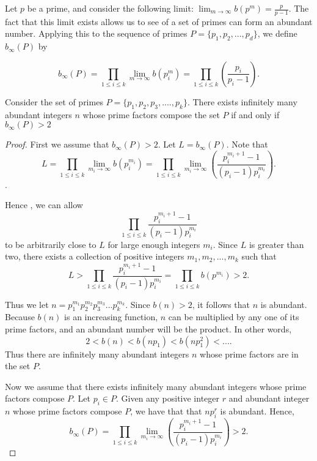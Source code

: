 \documentclass[../paper.tex]{article}
\begin{document}
Let $p$ be a prime, and consider the following limit: 
$\lim_{m \rightarrow \infty}b(p^m) = \frac{p}{p-1}$.
The fact that this limit exists allows us to see of a set
of primes can form an abundant number.
Applying this to the sequence of primes $P = \{p_1, p_2, ..., p_d\}$,
we define $b_{\infty}(P)$ by

\begin{equation}\label{b_inf_def}
  b_{\infty}(P) 
  = \prod_{1 \leq i \leq k} \lim_{m \rightarrow \infty}b(p_i^m)
                = \prod_{1 \leq i \leq k}(\frac{p_i}{p_i - 1}) .
\end{equation}

\begin{theorem}\label{b_inf_1}
Consider the set of primes 
%
$P = \{p_{1}, p_{2}, p_{3}, .... , p_{k}\}$.
%
There exists infinitely many abundant integers $n$ whose prime 
factors compose the set $P$  if and only if $b_{\infty}(P) > 2$

\end{theorem}

\begin{proof}

First we assume that $b_{\infty}(P) > 2$. Let $L = b_\infty(P)$. 
Note that
%  
$$L 
%
= \prod_{1 \leq i \leq k} \lim_{m_i \rightarrow \infty}b(p_i^{m_i}) 
%
= \prod_{1 \leq i \leq k} \lim_{m_i \rightarrow \infty} 
%
( \frac{p_i^{m_{i} + 1} -1}{(p_i -1)p_{i}^{m_{i}}}) .$$.

Hence , we can allow
$$\prod_{1 \leq i \leq k} \frac{p_i^{m_{i} + 1} -1}
{(p_i -1)p_{i}^{m_{i}}}$$ 
to be arbitrarily close to $L$ for large 
enough integers $m_i$. Since $L$ is greater than two, there exists a
collection of positive integers $m_1, m_2, ... , m_k$ such that 
% 
$$L > \prod_{1 \leq i \leq k} \frac{p_i^{m_{i} + 1} -1}
{(p_i -1)p_{i}^{m_{i}}} = \prod_{1 \leq i \leq k} b(p^{m_i}) > 2 .$$
%

Thus we let $n=p_1^{m_1}p_2^{m_2}p_3^{m_3}...p_{k}^{m_k}$. 
Since $b(n) > 2$, it follows that $n$ is abundant. 
Because $b(n)$ is an increasing function, $n$ can be multiplied
by any one of its prime factors, and an abundant number 
will be the product. In other words,
%
$$2 < b(n) < b(np_1) < b(np_1^2) < ... .$$
%
Thus there are infinitely many abundant integers $n$ whose prime
factors are in the set $P$.

Now we assume that there exists infinitely many abundant integers 
 whose prime factors compose $P$. Let $p_i \in P$. Given any
positive integer $r$ and abundant integer $n$ whose prime factors 
compose $P$, we have that that $np_i^r$ is abundant. Hence,
%
$$ b_\infty(P) = \prod_{1 \leq i \leq k} \lim_{m_i \rightarrow 
\infty} ( \frac{p_i^{m_{i} + 1} -1}{(p_i -1)p_{i}^{m_{i}}}) > 2 .$$

\end{proof}
\end{document}
